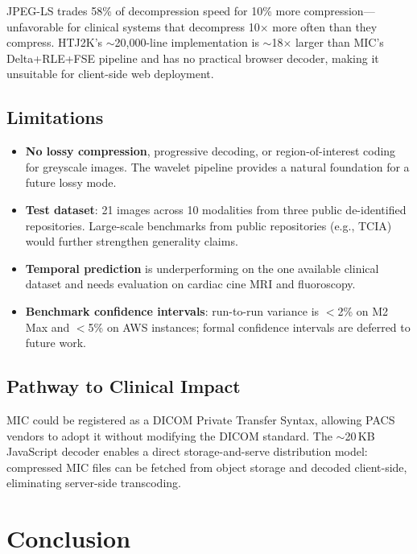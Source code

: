 \documentclass[10pt,twocolumn]{article}
\begin{document}
JPEG-LS trades 58\% of decompression speed for 10\% more compression---unfavorable
for clinical systems that decompress 10$\times$ more often than they compress.
HTJ2K's $\sim$20,000-line implementation is $\sim$18$\times$ larger than MIC's
Delta+RLE+FSE pipeline and has no practical browser decoder, making it unsuitable
for client-side web deployment.

\subsection{Limitations}

\begin{itemize}
  \item \textbf{No lossy compression}, progressive decoding, or
  region-of-interest coding for greyscale images. The wavelet pipeline provides
  a natural foundation for a future lossy mode.
  \item \textbf{Test dataset}: 21 images across 10 modalities from three public
  de-identified repositories. Large-scale benchmarks from public repositories
  (e.g., TCIA) would further strengthen generality claims.
  \item \textbf{Temporal prediction} is underperforming on the one available
  clinical dataset and needs evaluation on cardiac cine MRI and fluoroscopy.
  \item \textbf{Benchmark confidence intervals}: run-to-run variance is $<$2\%
  on M2 Max and $<$5\% on AWS instances; formal confidence intervals are deferred
  to future work.
\end{itemize}

\subsection{Pathway to Clinical Impact}

MIC could be registered as a DICOM Private Transfer Syntax, allowing PACS
vendors to adopt it without modifying the DICOM standard. The $\sim$20\,KB
JavaScript decoder enables a direct storage-and-serve distribution model:
compressed MIC files can be fetched from object storage and decoded client-side,
eliminating server-side transcoding.

\section{Conclusion}
\label{sec:conclusion}
\end{document}
